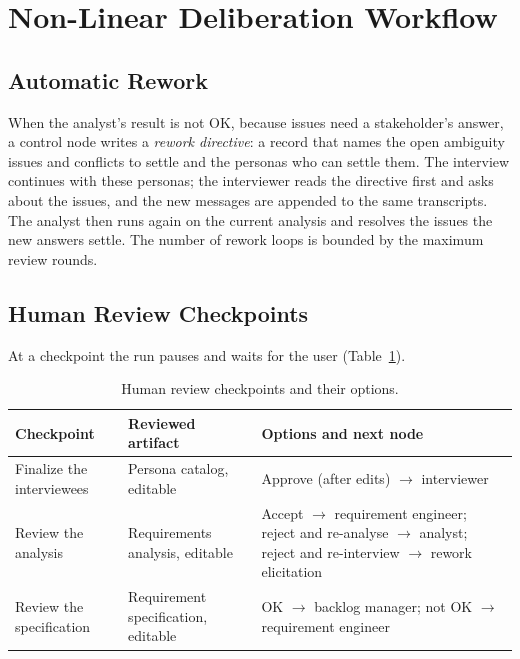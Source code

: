 \section{Non-Linear Deliberation Workflow}
\label{sec:pa-deliberation}

\subsection{Automatic Rework}
\label{sec:pa-rework}
When the analyst's result is not OK, because issues need a stakeholder's answer, a control node writes a \emph{rework directive}: a record that names the open ambiguity issues and conflicts to settle and the personas who can settle them. The interview continues with these personas; the interviewer reads the directive first and asks about the issues, and the new messages are appended to the same transcripts. The analyst then runs again on the current analysis and resolves the issues the new answers settle. The number of rework loops is bounded by the maximum review rounds.

\subsection{Human Review Checkpoints}
\label{sec:pa-checkpoints}
At a checkpoint the run pauses and waits for the user (Table~\ref{tab:pa-checkpoints}).

\begin{table}[H]
    \centering
    \caption{Human review checkpoints and their options.}
    \label{tab:pa-checkpoints}
    \begin{tabularx}{\linewidth}{|l|X|X|}
        \hline
        \textbf{Checkpoint} & \textbf{Reviewed artifact} & \textbf{Options and next node} \\
        \hline
        Finalize the interviewees & Persona catalog, editable & Approve (after edits) $\rightarrow$ interviewer \\
        Review the analysis & Requirements analysis, editable & Accept $\rightarrow$ requirement engineer; reject and re-analyse $\rightarrow$ analyst; reject and re-interview $\rightarrow$ rework elicitation \\
        Review the specification & Requirement specification, editable & OK $\rightarrow$ backlog manager; not OK $\rightarrow$ requirement engineer \\
        \hline
    \end{tabularx}
\end{table}


